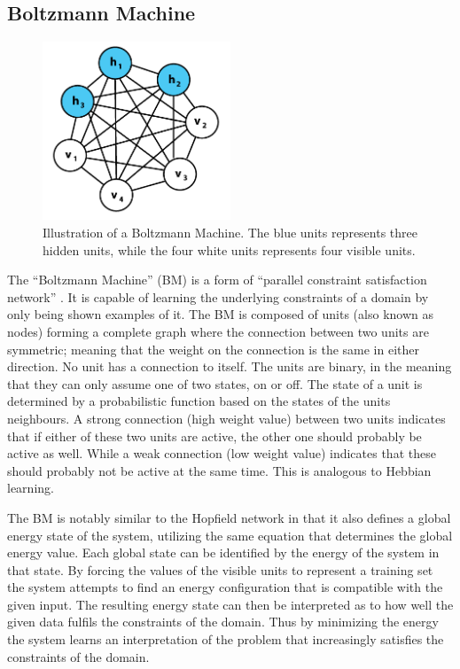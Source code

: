 \subsection{Boltzmann Machine}


\begin{figure}[htbp]
	\begin{center}
		\includegraphics[width=0.5\textwidth]{inc/boltzmann_machine.png}
		\caption{Illustration of a Boltzmann Machine. The blue units represents three hidden units, while the four white units represents four visible units.\protect\footnotemark}
		\label{fig:boltzmann_machine}
	\end{center}
\end{figure}

The ``Boltzmann Machine'' (BM) is a form of ``parallel constraint satisfaction network'' \cite{ackley1985learning}. It is capable of learning the underlying constraints of a domain by only being shown examples of it. The BM is composed of units (also known as nodes) forming a complete graph where the connection between two units are symmetric; meaning that the weight on the connection is the same in either direction. No unit has a connection to itself. The units are binary, in the meaning that they can only assume one of two states, on or off. The state of a unit is determined by a probabilistic function based on the states of the units neighbours. A strong connection (high weight value) between two units indicates that if either of these two units are active, the other one should probably be active as well. While a weak connection (low weight value) indicates that these should probably not be active at the same time. This is analogous to Hebbian learning.

The BM is notably similar to the Hopfield network in that it also defines a global energy state of the system, utilizing the same equation that determines the global energy value. Each global state can be identified by the energy of the system in that state. By forcing the values of the visible units to represent a training set the system attempts to find an energy configuration that is compatible with the given input. The resulting energy state can then be interpreted as to how well the given data fulfils the constraints of the domain. Thus by minimizing the energy the system learns an interpretation of the problem that increasingly satisfies the constraints of the domain.

